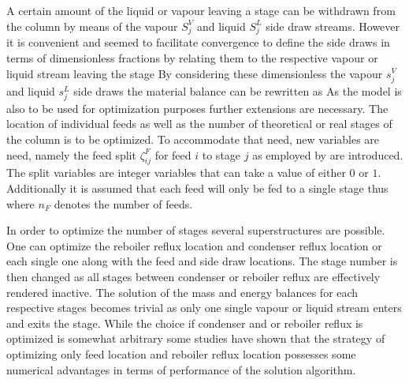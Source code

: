        A certain amount of the liquid or vapour leaving a stage can be withdrawn from the column by means
        of the vapour $S^V_j$ and liquid $S^L_j$ side draw streams. However it is convenient and seemed
        to facilitate convergence to define the side draws in terms of dimensionless fractions by relating them
        to the respective vapour or liquid stream leaving the stage
        By considering these dimensionless the vapour $s_j^V$ and liquid $s_j^L$ side draws the material
        balance can be rewritten as
        As the model is also to be used for optimization purposes further extensions are necessary.
        The location of individual feeds as well as the number of theoretical or real stages of the
        column is to be optimized. To accommodate that need, new variables are need, namely the feed
        split $\zeta_{ij}^F$ for feed $i$ to stage $j$ as employed by \cite{Dunnebier.1999} are introduced.
        The split variables are integer variables that can take a value of either $0$ or $1$. Additionally it is
        assumed that each feed will only be fed to a single stage thus
        where $n_F$ denotes the number of feeds.

        In order to optimize the number of stages several superstructures are possible. One can
        optimize the reboiler reflux location and condenser reflux location or each single one
        along with the feed and side draw locations. The stage number is then changed as all stages
        between condenser or reboiler reflux are effectively rendered inactive. The solution of
        the mass and energy balances for each respective stages becomes trivial as only one single
        vapour or liquid stream enters and exits the stage. While the choice if condenser and or reboiler
        reflux is optimized is somewhat arbitrary some studies have shown \cite{Grossmann.2005} that
        the strategy of optimizing only feed location and reboiler reflux location possesses some
        numerical advantages in terms of performance of the solution algorithm.

